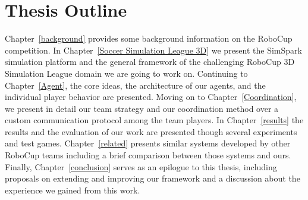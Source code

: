 \section{Thesis Outline}
Chapter~\ref{background} provides some background information on the RoboCup competition. In Chapter~\ref{Soccer Simulation League 3D} we present the SimSpark simulation platform and the general framework of the challenging RoboCup 3D Simulation League domain we are going to work on. Continuing to Chapter~\ref{Agent}, the core ideas, the architecture of our agents, and the individual player behavior are presented. Moving on to Chapter~\ref{Coordination}, we present in detail our team strategy and our coordination method over a custom communication protocol among the team players. In Chapter~\ref{results} the results and the evaluation of our work are presented though several experiments and test games. Chapter~\ref{related} presents similar systems developed by other RoboCup teams including a brief comparison between those systems and ours. Finally, Chapter~\ref{conclusion} serves as an epilogue to this thesis, including proposals on extending and improving our framework and a discussion about the experience we gained from this work. 

